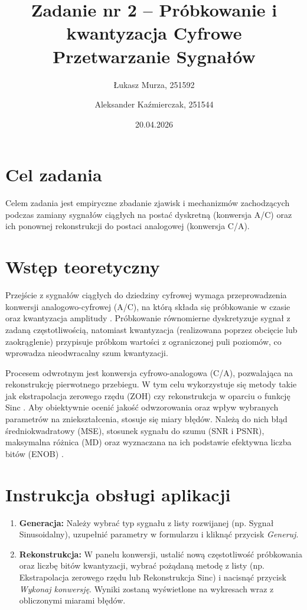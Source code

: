 \documentclass[12pt]{article}
\title{{\bf Zadanie nr 2 -- Próbkowanie i kwantyzacja}\linebreak
Cyfrowe Przetwarzanie Sygnałów}
\author{Łukasz Murza, 251592 \and Aleksander Kaźmierczak, 251544}
\date{20.04.2026}
\begin{document}
\maketitle
\thispagestyle{empty}
\newpage
\setcounter{page}{1}

\section{Cel zadania}
Celem zadania jest empiryczne zbadanie zjawisk i mechanizmów zachodzących podczas zamiany sygnałów ciągłych na postać dyskretną (konwersja A/C) oraz ich ponownej rekonstrukcji do postaci analogowej (konwersja C/A).

\section{Wstęp teoretyczny}
Przejście z sygnałów ciągłych do dziedziny cyfrowej wymaga przeprowadzenia konwersji analogowo-cyfrowej (A/C), na którą składa się próbkowanie w czasie oraz kwantyzacja amplitudy \cite{1}. Próbkowanie równomierne dyskretyzuje sygnał z zadaną częstotliwością, natomiast kwantyzacja (realizowana poprzez obcięcie lub zaokrąglenie) przypisuje próbkom wartości z ograniczonej puli poziomów, co wprowadza nieodwracalny szum kwantyzacji.

Procesem odwrotnym jest konwersja cyfrowo-analogowa (C/A), pozwalająca na rekonstrukcję pierwotnego przebiegu. W tym celu wykorzystuje się metody takie jak ekstrapolacja zerowego rzędu (ZOH) czy rekonstrukcja w oparciu o funkcję Sinc \cite{1}. Aby obiektywnie ocenić jakość odwzorowania oraz wpływ wybranych parametrów na zniekształcenia, stosuje się miary błędów. Należą do nich błąd średniokwadratowy (MSE), stosunek sygnału do szumu (SNR i PSNR), maksymalna różnica (MD) oraz wyznaczana na ich podstawie efektywna liczba bitów (ENOB) \cite{1}.

\section{Instrukcja obsługi aplikacji}
\begin{enumerate}
    \item \textbf{Generacja:} Należy wybrać typ sygnału z listy rozwijanej (np. Sygnał Sinusoidalny), uzupełnić parametry w formularzu i kliknąć przycisk \textit{Generuj}.
    \item \textbf{Rekonstrukcja:} W panelu konwersji, ustalić nową częstotliwość próbkowania oraz liczbę bitów kwantyzacji, wybrać pożądaną metodę z listy (np. Ekstrapolacja zerowego rzędu lub Rekonstrukcja Sinc) i nacisnąć przycisk \textit{Wykonaj konwersję}. Wyniki zostaną wyświetlone na wykresach wraz z obliczonymi miarami błędów.
\end{enumerate}
\end{document}
